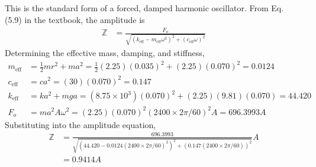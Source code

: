 \subsection{}
This is the standard form of a forced, damped harmonic oscillator. From Eq. (5.9) in the textbook, the amplitude is 
\begin{align*}
    \mathbb{Z} &= \frac{F_o}{\sqrt{\left(k_{\text{eff}} - m_{\text{eff}} \omega^2 \right)^2 + \left(c_{\text{eff}} \omega \right)^2}}
\end{align*}
Determining the effective mass, damping, and stiffness,
\begin{align*}
    m_{\text{eff}} &= \frac{1}{2} m r^2 + m a^2 = \frac{1}{2} (2.25)(0.035)^2 + (2.25)(0.070)^2 = 0.0124 \\
    c_{\text{eff}} &= c a^2 = (30)(0.070)^2 = 0.147 \\
    k_{\text{eff}} &= k a^2 + m g a = (8.75\times 10^3)(0.070)^2 + (2.25)(9.81)(0.070) = 44.420\\
    F_o &= m a^2 A \omega^2 = (2.25)(0.070)^2 (2400 \times 2\pi / 60)^2 A= 696.3993 A
\end{align*}
Substituting into the amplitude equation,
\begin{align*}
    \mathbb{Z} &= \frac{696.3993}{\sqrt{\left(44.420 - 0.0124 (2400 \times 2\pi / 60)^2 \right)^2 + \left(0.147 (2400 \times 2\pi / 60) \right)^2}}A \\
    &= \boxed{0.9414 A}
\end{align*}